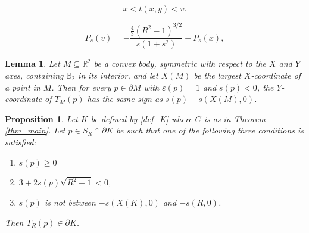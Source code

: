\documentclass[10pt,a4paper]{amsart}
\newtheorem{proposition}{Proposition}
\newtheorem{lemma}{Lemma}
\def \B{\mathbb B}
\def \R{\mathbb R}
\def \e{\varepsilon}
\begin{document}
\begin{equation}
	\label{eq_middle}
	x < t(x,y) < v.
\end{equation}

\begin{equation}
	\label{eq_billardeq}
	P_{s}(v) = - \frac{\frac 43 (R^2-1)^{3/2}}{s(1+s^2)} + P_{s}(x) ,
\end{equation}

\begin{lemma}
	\label{lem_side}
	Let $M \subseteq \R^2$ be a convex body, symmetric with respect to the $X$ and $Y$ axes, containing $\B_2$ in its interior, and let $X(M)$ be the largest $X$-coordinate of a point in $M$.
	Then for every $p \in \partial M$ with $\e(p)=1$ and $s(p)<0$, 
	the $Y$-coordinate of $T_M(p)$ has the same sign as $s(p) + s(X(M),0)$.
\end{lemma}

\begin{proposition}
	\label{prop_uniqueness_cases}
	Let $K$ be defined by \eqref{def_K} where $C$ is as in Theorem \ref{thm_main}.
	Let $p \in S_R \cap \partial K$ be such that one of the following three conditions is satisfied:
	\begin{enumerate}[label = (\alph*), ref = \alph* ]
		\item \label{cond_region} $s(p) \geq 0$
		\item \label{cond_apriori} $3+2s(p) \sqrt{R^2-1} < 0$,
		\item \label{cond_interval} $s(p)$ is not between $-s(X(K),0)$ and $-s(R,0)$.
	\end{enumerate}
	Then $T_R(p) \in \partial K$.
\end{proposition}
\end{document}
